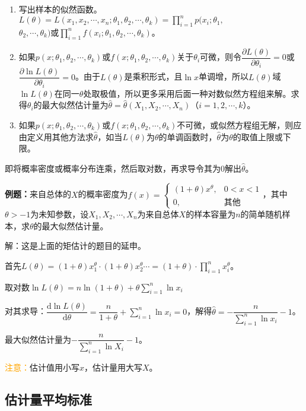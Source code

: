 \documentclass[UTF8, 12pt]{ctexart}
\begin{document}
\begin{enumerate}
    \item 写出样本的似然函数。$L(\theta)=L(x_1,x_2,\cdots,x_n;\theta_1,\theta_2,\cdots,\theta_k)=\prod\limits_{i=1}^np(x_i;\theta_1,$\\$\theta_2,\cdots,\theta_k)$或$\prod\limits_{i=1}^nf(x_i;\theta_1,\theta_2,\cdots,\theta_k)$。
    \item 如果$p(x;\theta_1,\theta_2,\cdots,\theta_k)$或$f(x;\theta_1,\theta_2,\cdots,\theta_k)$关于$\theta_i$可微，则令$\dfrac{\partial L(\theta)}{\partial\theta_i}=0$或$\dfrac{\partial\ln L(\theta)}{\partial\theta_i}=0$。由于$L(\theta)$是乘积形式，且$\ln x$单调增，所以$L(\theta)$域$\ln L(\theta)$在同一$\theta$处取极值，所以更多采用后面一种对数似然方程组来解。求得$\theta_i$的最大似然估计量为$\hat{\theta}=\hat{\theta}(X_1,X_2,\cdots,X_n)$（$i=1,2,\cdots,k$）。
    \item 如果$p(x;\theta_1,\theta_2,\cdots,\theta_k)$或$f(x;\theta_1,\theta_2,\cdots,\theta_k)$不可微，或似然方程组无解，则应由定义用其他方法求$\hat{\theta}$，如当$L(\theta)$为$\theta$的单调函数时，$\hat{\theta}$为$\theta$的取值上限或下限。
\end{enumerate}

即将概率密度或概率分布连乘，然后取对数，再求导令其为0解出$\hat{\theta}$。

\textbf{例题：}来自总体的$X$的概率密度为$f(x)=\left\{\begin{array}{ll}
    (1+\theta)x^\theta, & 0<x<1 \\
    0, & \text{其他}
\end{array}\right.$，其中$\theta>-1$为未知参数，设$X_1,X_2,\cdots,X_n$为来自总体$X$的样本容量为$n$的简单随机样本，求$\theta$的最大似然估计量。

解：这是上面的矩估计的题目的延申。

首先$L(\theta)=(1+\theta)x_1^\theta\cdot(1+\theta)x_2^\theta\cdots=(1+\theta)\cdot\prod\limits_{i=1}^nx_i^\theta$。

取对数$\ln L(\theta)=n\ln(1+\theta)+\theta\sum\limits_{i=1}^n\ln x_i$

对其求导：$\dfrac{\textrm{d}\ln L(\theta)}{\textrm{d}\theta}=\dfrac{n}{1+\theta}+\sum\limits_{i=1}^n\ln x_i=0$，解得$\hat{\theta}=-\dfrac{n}{\sum\limits_{i=1}^n\ln x_i}-1$。

最大似然估计量为$-\dfrac{n}{\sum\limits_{i=1}^n\ln X_i}-1$。

\textcolor{orange}{注意：}估计值用小写$x$，估计量用大写$X$。

\subsection{估计量平均标准}
\end{document}
